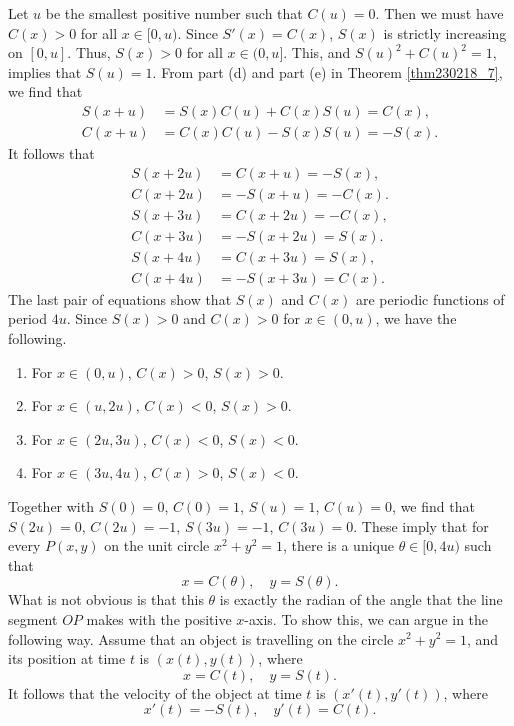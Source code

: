 Let $u$ be the smallest positive number such that $C(u)=0$. Then we must have $C(x)>0$ for all $x\in [0, u)$. Since $S'(x)=C(x)$, $S(x)$ is strictly increasing on $[0, u]$. Thus, $S(x)>0$ for all $x\in (0, u]$. This, and $S(u)^2+C(u)^2=1$, implies that $S(u)=1$.
From part (d) and part (e) in Theorem \ref{thm230218_7}, we find that
\begin{subequations}
\begin{align*}
S(x+u)&=S(x)C(u)+C(x)S(u)=C(x),\\
C(x+u)&=C(x)C(u)-S(x)S(u)=-S(x).
\end{align*}
\end{subequations}It follows that
\begin{subequations}
\begin{align*}
S(x+2u)&=C(x+u)=-S(x),\\
C(x+2u)&= -S(x+u)=-C(x).
\\
S(x+3u)&=C(x+2u)=-C(x),\\
C(x+3u)&= -S(x+2u)=S(x).
\\
S(x+4u)&=C(x+3u)=S(x),\\
C(x+4u)&= -S(x+3u)=C(x).
\end{align*}
\end{subequations}The last pair of equations show that $S(x)$ and $C(x)$ are periodic functions of period $4u$. Since $S(x)>0$ and $C(x)>0$ for $x\in (0,u)$, we have the following.
\begin{enumerate}[$\bullet$\;\;]
\item For $x\in (0, u)$, $C(x)>0$, $S(x)>0$.
\item For $x\in (u, 2u)$, $C(x)<0$, $S(x)>0$.
\item For $x\in (2u, 3u)$, $C(x)<0$, $S(x)<0$.
\item For $x\in (3u, 4u)$, $C(x)>0$, $S(x)<0$.
\end{enumerate}
Together with $S(0)=0$, $C(0)=1$,  $S(u)=1$, $C(u)=0$, we find that $S(2u)=0$, $C(2u)=-1$, $S(3u)=-1$, $C(3u)=0$. These imply that for every $P(x, y)$ on the unit circle $x^2+y^2=1$, there is a unique $\theta\in [0, 4u)$ such that
\[x=C(\theta), \quad y=S(\theta).\]
 What is not obvious is that this $\theta$ is exactly the radian of the angle that the line segment $OP$ makes with the positive $x$-axis. To show this, we can argue in the following way. Assume that an object is travelling on the circle $x^2+y^2=1$, and its position at time $t$ is $(x(t), y(t))$, where
\[x=C(t), \quad y=S(t).\]
It follows that the velocity of the object at time $t$ is $(x'(t), y'(t))$, where
\[x'(t)=-S(t),\quad y'(t)=C(t).\]
